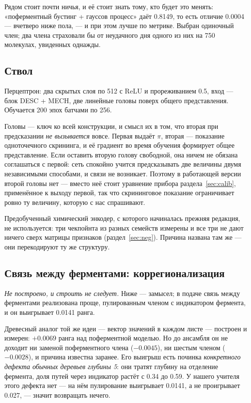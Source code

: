 Рядом стоит почти ничья, и её стоит знать тому, кто будет это менять: «поферментный бустинг + гауссов
процесс» даёт 0.8149, то есть отличие 0.0004 --- вчетверо ниже пола, --- и при этом лучше по метрике.
Выбран одиночный член; два члена страховали бы от неудачного дня одного из них на 750 молекулах,
увиденных однажды.

\subsection{Ствол}

Перцептрон: два скрытых слоя по 512 с ReLU и прореживанием 0.5, вход --- блок DESC + MECH, две линейные
головы поверх общего представления. Обучается 200 эпох батчами по 256.

Головы --- ключ ко всей конструкции, и смысл их в том, что вторая при предсказании \emph{не вызывается}
вовсе. Первая выдаёт $\pi$, вторая --- показание одноточечного скрининга, и её градиент во время
обучения формирует общее представление. Если оставить вторую голову свободной, она ничем не обязана
соглашаться с первой: сеть спокойно учится предсказывать две величины двумя независимыми способами, и
связи не возникает. Поэтому в работающей версии второй головы нет --- вместо неё стоит уравнение прибора
раздела~\ref{sec:calib}, применённое к выходу первой, так что скрининговое показание ограничивает ровно
ту величину, которую с нас спрашивают.

Предобученный химический энкодер, с которого начиналась прежняя редакция, не используется: три
чекпойнта из разных семейств измерены и все три не дают ничего сверх матрицы признаков
(раздел~\ref{sec:neg}). Причина названа там же --- они перекодируют ту же структуру.

\subsection{Связь между ферментами: коррегионализация}
\label{sec:icm}

\emph{Не построено, и строить не следует.} Ниже --- замысел; в подаче связь между ферментами
реализована проще, пулированным членом с индикатором фермента, и он выигрывает 0.0141 ранга.

Древесный аналог той же идеи --- вектор значений в каждом листе --- построен и измерен: $+0.0069$
ранга над поферментной моделью. Но до ансамбля он не доходит ни заменой поферментного члена
($-0.0045$), ни шестым членом ($-0.0028$), и причина известна заранее. Его выигрыш есть починка
\emph{конкретного дефекта обычных деревьев глубины 5}: они тратят глубину на отделение фермента,
доля путей через индикатор растёт с 0.34 до 0.59. У нашего учителя этого дефекта нет --- на нём
пулирование выигрывает 0.0141, а не проигрывает 0.027, --- значит возвращать нечего.

